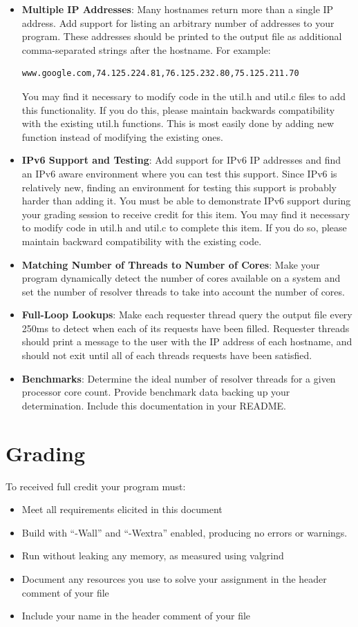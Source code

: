 \documentclass[12pt]{article}
\begin{document}
\begin{itemize}
\item {\bf Multiple IP Addresses}: Many hostnames return more than a
  single IP address. Add support for listing an arbitrary number of
  addresses to your program. These addresses should be printed to the
  output file as additional comma-separated strings after the
  hostname. For example:
\begin{verbatim}
www.google.com,74.125.224.81,76.125.232.80,75.125.211.70
\end{verbatim}
You may find it necessary to modify code in the util.h and util.c
files to add this functionality. If you do this, please maintain
backwards compatibility with the existing util.h functions. This is
most easily done by adding new function instead of modifying the
existing ones.
\item {\bf IPv6 Support and Testing}: Add support for IPv6 IP
  addresses and find an IPv6 aware environment where you can test this
  support. Since IPv6 is relatively new, finding an environment
  for testing this support is probably harder than adding it. You must
  be able to demonstrate IPv6 support during your grading session to receive
  credit for this item. You may find it necessary to modify code in
  util.h and util.c to complete this item. If you do so, please
  maintain backward compatibility with the existing code.
\item {\bf Matching Number of Threads to Number of Cores}:
  Make your program dynamically detect the number of cores available on a
  system and set the number of resolver threads to take into account
  the number of cores.
\item {\bf Full-Loop Lookups}: Make each requester thread query the
  output file every 250ms to detect when each of its requests have
  been filled. Requester threads should print a message to the user
  with the IP address of each hostname, and should not exit until all
  of each threads requests have been satisfied.
\item {\bf Benchmarks}: Determine the ideal number of resolver threads
  for a given processor core count. Provide benchmark data backing up
  your determination. Include this documentation in your README.
\end{itemize}

\section{Grading}

To received full credit your program must:
\begin{itemize}
\item Meet all requirements elicited in this document
\item Build with ``-Wall'' and ``-Wextra'' enabled, producing no errors
  or warnings.
\item Run without leaking any memory, as measured using valgrind
\item Document any resources you use to solve your assignment in the header comment of your file
\item Include your name in the header comment of your file
\end{itemize}
\end{document}
